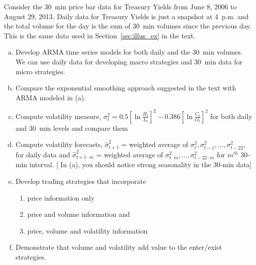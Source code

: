 \prob Consider the 30~min price bar data for Treasury Yields from June 8, 2006 to August 29, 2013. Daily data for Treasury Yields is just a snapshot at 4~p.m. and the total volume for the day is the sum of 30~min volumes since the previous day. This is the same data used in Section~\ref{sec:illus_ex} in the text.
   \begin{enumerate}[(a)]
   \item Develop ARMA time series models for both daily and the 30~min volumes. We can use daily data
for developing macro strategies and 30~min data for micro strategies.
\item Compare the exponential smoothing approach suggested in the text with ARMA modeled in (a).
   \item Compute volatility measure, $\sigma_t^2 = 0.5[\ln{\frac{H_t}{L_t}}]^2 - 0.386[\ln{\frac{C_t}{O_t}}]^2$ for both daily and 30~min levels and compare them
   \item Compute volatility forecasts, $\hat{\sigma}_{t+1}^2$ = weighted average of $\sigma_{t}^2, \sigma_{t-1}^2,...,\sigma_{t-22}^2$, for daily data and $\hat{\sigma}_{t+1\cdot m}^2$ = weighted average of $\sigma_{t\cdot m}^2,...,\sigma_{t-22\cdot m}^2$ for $m^{th}$ 30-min interval. [ In (a), you should notice strong seasonality in the 30-min data]
   \item Develop trading strategies that incorporate
      \begin{enumerate}
      \item price information only
      \item price and volume information and
      \item price, volume and volatility information
      \end{enumerate}
         \item Demonstrate that volume and volatility add value to the enter/exist strategies. \twomedskip
   \end{enumerate}